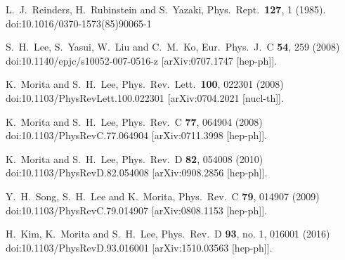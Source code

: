 \documentclass[aps,prc,superscriptaddress,showpacs,floatfix, nofootinbib,preprintnumbers,twocolumn]{revtex4}
\begin{document}
\begin{thebibliography}{50}
  L.~J.~Reinders, H.~Rubinstein and S.~Yazaki,
  Phys.\ Rept.\  {\bf 127}, 1 (1985).
  doi:10.1016/0370-1573(85)90065-1
  
  S.~H.~Lee, S.~Yasui, W.~Liu and C.~M.~Ko,
  Eur.\ Phys.\ J.\ C {\bf 54}, 259 (2008)
  doi:10.1140/epjc/s10052-007-0516-z
  [arXiv:0707.1747 [hep-ph]].
  
  K.~Morita and S.~H.~Lee,
  Phys.\ Rev.\ Lett.\  {\bf 100}, 022301 (2008)
  doi:10.1103/PhysRevLett.100.022301
  [arXiv:0704.2021 [nucl-th]].
  
  K.~Morita and S.~H.~Lee,
  Phys.\ Rev.\ C {\bf 77}, 064904 (2008)
  doi:10.1103/PhysRevC.77.064904
  [arXiv:0711.3998 [hep-ph]].

  K.~Morita and S.~H.~Lee,
  Phys.\ Rev.\ D {\bf 82}, 054008 (2010)
  doi:10.1103/PhysRevD.82.054008
  [arXiv:0908.2856 [hep-ph]].
  
  Y.~H.~Song, S.~H.~Lee and K.~Morita,
  Phys.\ Rev.\ C {\bf 79}, 014907 (2009)
  doi:10.1103/PhysRevC.79.014907
  [arXiv:0808.1153 [hep-ph]].
  
  H.~Kim, K.~Morita and S.~H.~Lee,
  Phys.\ Rev.\ D {\bf 93}, no. 1, 016001 (2016)
  doi:10.1103/PhysRevD.93.016001
  [arXiv:1510.03563 [hep-ph]].



\end{thebibliography}
\end{document}
